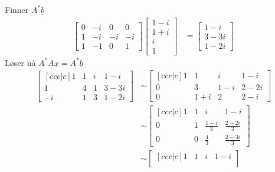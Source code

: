 \documentclass[11pt, a4paper, norsk]{NTNUoving}
\begin{document}
\begin{oppgave}
\begin{punkt}
            Finner $A^{*}\underline{b}$
            \begin{align*}
                \begin{bmatrix}
                    0 & -i & 0 & 0 \\
                    1 & -i & -i & -i \\
                    1 & -1 & 0 & 1
                \end{bmatrix}\begin{bmatrix}
                    1-i \\
                    1+i \\
                    i \\
                    1
                \end{bmatrix} &= \begin{bmatrix}
                    1-i \\
                    3-3i \\
                    1-2i
                \end{bmatrix}
            \end{align*}
            Løser nå $A^{*}A\underline{x} = A^{*}\underline{b}$
            \begin{align*}
                \begin{bmatrix}[ccc|c]
                    1 & 1 & i & 1-i \\
                    1 & 4 & 1 & 3-3i \\
                    -i & 1 & 3 & 1-2i
                \end{bmatrix} &\sim \begin{bmatrix}[ccc|c]
                1 & 1 & i & 1-i \\
                0 & 3 & 1 - i & 2 - 2 i \\
                0 & 1 + i & 2 & 2-i
                \end{bmatrix}
                \\
                &\sim \begin{bmatrix}[ccc|c]
                    1 & 1 & i & 1-i \\
                    0 & 1 & \frac{1-i}{3} & \frac{2-2i}{3} \\
                    0 & 0 & \frac{4}{3} & \frac{2-3i}{3}
                \end{bmatrix}
                \\
                &\sim \begin{bmatrix}[ccc|c]
                    1 & 1 & i & 1-i \\

\end{bmatrix}
\end{align*}
\end{punkt}
\end{oppgave}
\end{document}
